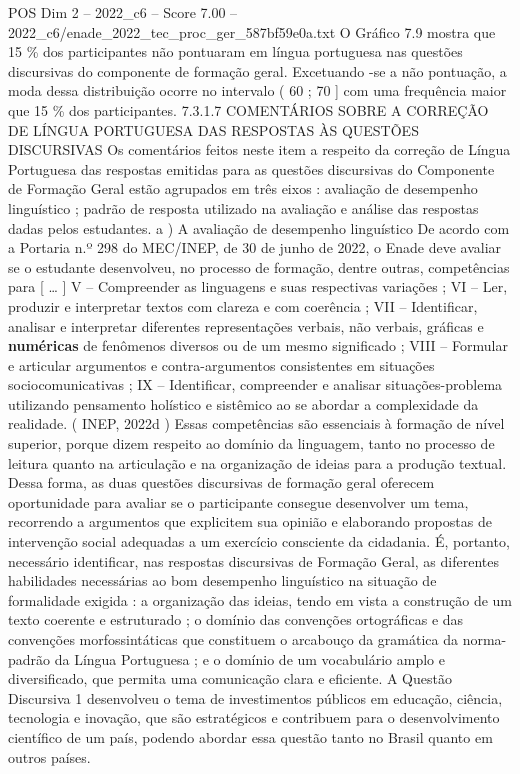 \begin{textsample}{POS Dim 2 – 2022\_c6 – Score 7.00 – 2022\_c6/enade\_2022\_tec\_proc\_ger\_587bf59e0a.txt}
O Gráfico 7.9 mostra que 15 \% dos participantes não pontuaram em língua portuguesa nas questões discursivas do componente de formação geral.
Excetuando -se a não pontuação, a moda dessa distribuição ocorre no intervalo ( 60 ; 70 ] com uma frequência maior que 15 \% dos participantes. 7.3.1.7 COMENTÁRIOS SOBRE A CORREÇÃO DE LÍNGUA PORTUGUESA DAS RESPOSTAS ÀS QUESTÕES DISCURSIVAS Os comentários feitos neste item a respeito da correção de Língua Portuguesa das respostas emitidas para as questões discursivas do Componente de Formação Geral estão agrupados em três eixos : avaliação de desempenho linguístico ; padrão de resposta utilizado na avaliação e análise das respostas dadas pelos estudantes. a ) A avaliação de desempenho linguístico De acordo com a Portaria n.º 298 do MEC/INEP, de 30 de junho de 2022, o Enade deve avaliar se o estudante desenvolveu, no processo de formação, dentre outras, competências para [ … ] V – Compreender as linguagens e suas respectivas variações ; VI – Ler, produzir e interpretar textos com clareza e com coerência ; VII – Identificar, analisar e interpretar diferentes representações verbais, não verbais, gráficas e \textbf{numéricas} de fenômenos diversos ou de um mesmo significado ; VIII – Formular e articular argumentos e contra-argumentos consistentes em situações sociocomunicativas ; IX – Identificar, compreender e analisar situações-problema utilizando pensamento holístico e sistêmico ao se abordar a complexidade da realidade. ( INEP, 2022d ) Essas competências são essenciais à formação de nível superior, porque dizem respeito ao domínio da linguagem, tanto no processo de leitura quanto na articulação e na organização de ideias para a produção textual.
Dessa forma, as duas questões discursivas de formação geral oferecem oportunidade para avaliar se o participante consegue desenvolver um tema, recorrendo a argumentos que explicitem sua opinião e elaborando propostas de intervenção social adequadas a um exercício consciente da cidadania.
É, portanto, necessário identificar, nas respostas discursivas de Formação Geral, as diferentes habilidades necessárias ao bom desempenho linguístico na situação de formalidade exigida : a organização das ideias, tendo em vista a construção de um texto coerente e estruturado ; o domínio das convenções ortográficas e das convenções morfossintáticas que constituem o arcabouço da gramática da norma-padrão da Língua Portuguesa ; e o domínio de um vocabulário amplo e diversificado, que permita uma comunicação clara e eficiente.
A Questão Discursiva 1 desenvolveu o tema de investimentos públicos em educação, ciência, tecnologia e inovação, que são estratégicos e contribuem para o desenvolvimento científico de um país, podendo abordar essa questão tanto no Brasil quanto em outros países.

\end{textsample}
